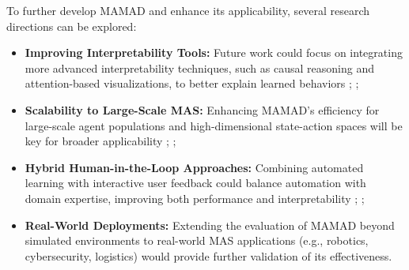 \documentclass[pdflatex,sn-mathphys-num]{sn-jnl}%
\theoremstyle{thmstyleone}%
\theoremstyle{thmstyletwo}%
\theoremstyle{thmstylethree}%
\begin{document}
To further develop MAMAD and enhance its applicability, several research directions can be explored:
%
\begin{itemize}
    \item \textbf{Improving Interpretability Tools:} Future work could focus on integrating more advanced interpretability techniques, such as causal reasoning and attention-based visualizations, to better explain learned behaviors ; ;
    \item \textbf{Scalability to Large-Scale MAS:} Enhancing MAMAD's efficiency for large-scale agent populations and high-dimensional state-action spaces will be key for broader applicability ; ;
    \item \textbf{Hybrid Human-in-the-Loop Approaches:} Combining automated learning with interactive user feedback could balance automation with domain expertise, improving both performance and interpretability ; ;
    \item \textbf{Real-World Deployments:} Extending the evaluation of MAMAD beyond simulated environments to real-world MAS applications (e.g., robotics, cybersecurity, logistics) would provide further validation of its effectiveness.
\end{itemize}





\end{document}
